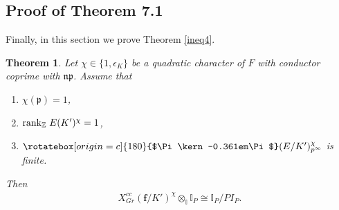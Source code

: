 \documentclass[reqno,10pt]{amsart}
\newcommand{\z}{\mathbb{Z}}
\newcommand{\I}{\mathbb{I}}
\newcommand{\f}{\mathbf{f}}
\newcommand{\p}{\mathfrak{p}}
\newcommand{\Varpi}{\rotatebox[origin=c]{180}{$\Pi\kern-0.361em\Pi$}}
\theoremstyle{plain}
\newtheorem{thm}{Theorem}[section]
\theoremstyle{definition}
\begin{document}
\subsection{Proof of Theorem 7.1}
Finally, in this section we prove Theorem \ref{ineq4}.

\begin{thm}
 Let $\chi \in \{1, \epsilon_K\}$ be a quadratic character of $F$ with conductor coprime with $\mathfrak{np}$. Assume that 
 \begin{enumerate}
     \item $\chi(\p) = 1$,
     \item $\mathrm{rank}_\z \hspace{0.01mm} \hspace{1mm} E(K')^\chi = 1$,
     \item $\Varpi(E/K')^\chi_{p^\infty}$ is finite.
 \end{enumerate}
 Then
 \begin{align*}
     X^{cc}_{Gr}(\f/K')^\chi \otimes_\I \I_P \cong \I_P/PI_P.
 \end{align*}
\end{thm}
\end{document}
